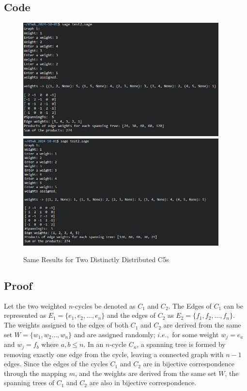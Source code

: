 \documentclass[12pt,letterpaper]{article}
\begin{document}
\subsection{Code}
 
	\begin{figure}[h!]
  \begin{center}
    \includegraphics[width=4.2in]{f2.1.jpg}
    \includegraphics[width=4.2in]{f2.11.jpg}
    \caption{\label{Patch} Same Results for Two Distinctly Distributed C5s}
  \end{center}
	\end{figure}
  
\subsection{Proof}

Let the two weighted $n$-cycles be denoted as $C_{1}$ and $C_{2}$. The Edges of $C_{1}$ can be represented as $E_{1}=\{e_{1},e_{2},\ldots,e_{n}\}$ and the edges of $C_{2}$ as $E_{2}=\{f_{1},f_{2},\ldots,f_{n}\}$. The weights assigned to the edges of both $C_{1}$ and $C_{2}$ are derived from the same set $W=\{w_{1},w_{2}\ldots,w_{n}\}$ and are assigned randomly; $i.e.,$ for some weight $w_{j}=e_{a}$ and $w_{j}=f_{b}$ where $a,b \le n$. In an \( n \)-cycle \( C_n \), a spanning tree is formed by removing exactly one edge from the cycle, leaving a connected graph with \( n-1 \) edges. Since the edges of the cycles \( C_1 \) and \( C_2 \) are in bijective correspondence through the mapping \( m \), and the weights are derived from the same set \( W \), the spanning trees of \( C_1 \) and \( C_2 \) are also in bijective correspondence.\\
\end{document}
